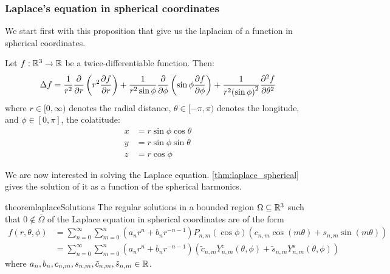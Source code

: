 \documentclass[../main.tex]{subfiles}
\begin{document}
\subsubsection{Laplace's equation in spherical coordinates}\label{sec:laplace_spherical}
We start first with this proposition that give us the laplacian of a function in spherical coordinates.
\begin{proposition}
  Let $f:\mathbb{R}^3\rightarrow\mathbb{R}$ be a twice-differentiable function. Then:
  \begin{equation}\label{eq:laplace}
    \Delta f = \frac{1}{r^2}\pdv{}{r}\left(r^2\pdv{f}{r}\right)+\frac{1}{r^2\sin\phi}\pdv{}{\phi}\left(\sin\phi\pdv{f}{\phi}\right)+\frac{1}{r^2{(\sin\phi)}^2}\pdv[2]{f}{\theta}
  \end{equation}
  where $r\in[0,\infty)$ denotes the radial distance, $\theta\in[-\pi,\pi)$ denotes the longitude, and $\phi\in[0,\pi]$, the colatitude:
  \begin{equation}
    \begin{aligned}
      x & =r\sin\phi\cos\theta \\
      y & =r\sin\phi\sin\theta \\
      z & =r\cos\phi
    \end{aligned}
  \end{equation}
\end{proposition}
We are now interested in solving the Laplace equation. \cref{thm:laplace_spherical} gives the solution of it as a function of the spherical harmonics.
\begin{restatable}{theorem}{laplaceSolutions}
  \label{thm:laplace_spherical}
  The regular solutions in a bounded region $\Omega\subseteq \mathbb{R}^3$ such that $0\notin\overline{\Omega}$ of the Laplace equation in spherical coordinates are of the form
  \begin{align}
    f(r,\theta,\phi) & = \sum_{n=0}^\infty \sum_{m=0}^n (a_n r^{n} +b_{n}r^{-n-1})P_{n,m}(\cos\phi) (c_{n,m}\cos(m\theta)+s_{n,m}\sin(m\theta))                                                              \\
                     & \label{eq:sol_laplace} = \sum_{n=0}^\infty \sum_{m=0}^n (a_n r^{n} +b_{n}r^{-n-1})(\tilde{c}_{n,m}Y_{n,m}^{\mathrm{c}}(\theta,\phi)+\tilde{s}_{n,m}Y_{n,m}^{\mathrm{s}}(\theta,\phi))
  \end{align}
  where $a_n,b_n,c_{n,m},s_{n,m},\tilde{c}_{n,m},\tilde{s}_{n,m}\in\mathbb{R}$.
\end{restatable}
\end{document}
